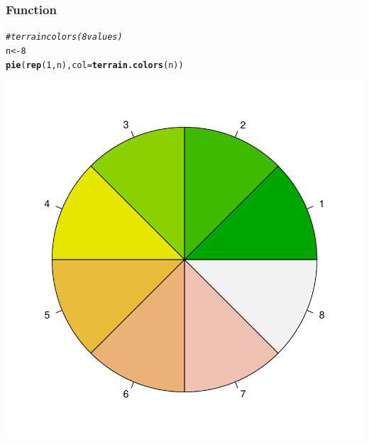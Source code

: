 \documentclass[12pt]{beamer}\usepackage[]{graphicx}\usepackage[]{color}
\makeatletter
\newcommand{\hlnum}[1]{\textcolor[rgb]{0.686,0.059,0.569}{#1}}%
\newcommand{\hlcom}[1]{\textcolor[rgb]{0.678,0.584,0.686}{\textit{#1}}}%
\newcommand{\hlstd}[1]{\textcolor[rgb]{0.345,0.345,0.345}{#1}}%
\newcommand{\hlkwb}[1]{\textcolor[rgb]{0.69,0.353,0.396}{#1}}%
\newcommand{\hlkwc}[1]{\textcolor[rgb]{0.333,0.667,0.333}{#1}}%
\newcommand{\hlkwd}[1]{\textcolor[rgb]{0.737,0.353,0.396}{\textbf{#1}}}%
\newenvironment{kframe}{%
 \def\at@end@of@kframe{}%
 \ifinner\ifhmode%
  \def\at@end@of@kframe{\end{minipage}}%
  \begin{minipage}{\columnwidth}%
 \fi\fi%
 \def\FrameCommand##1{\hskip\@totalleftmargin \hskip-\fboxsep
 \colorbox{shadecolor}{##1}\hskip-\fboxsep
     \hskip-\linewidth \hskip-\@totalleftmargin \hskip\columnwidth}%
 \MakeFramed {\advance\hsize-\width
   \@totalleftmargin\z@ \linewidth\hsize
   \@setminipage}}%
 {\par\unskip\endMakeFramed%
 \at@end@of@kframe}
\newenvironment{knitrout}{}{} %
\makeatother
\begin{document}
\begin{frame}[fragile]
\frametitle{Function }

\begin{knitrout}\scriptsize
{}\color{fgcolor}\begin{kframe}
\begin{alltt}
\hlcom{# terrain colors (8 values)}
\hlstd{n} \hlkwb{<-} \hlnum{8}
\hlkwd{pie}\hlstd{(}\hlkwd{rep}\hlstd{(}\hlnum{1}\hlstd{, n),} \hlkwc{col} \hlstd{=} \hlkwd{terrain.colors}\hlstd{(n))}
\end{alltt}
\end{kframe}

{\centering \includegraphics[width=.4\linewidth,height=.4\linewidth]{figure/terraincolors-1} 

}



\end{knitrout}

\end{frame}

\end{document}
